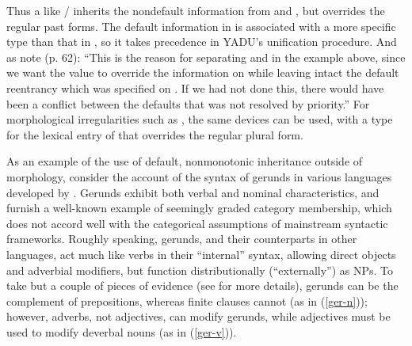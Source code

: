 \documentclass[output=paper
 	        ,biblatex
                ,babelshorthands
                ,newtxmath
                ,draftmode
                ,colorlinks, citecolor=brown
]{langscibook}
\begin{document}
Thus a  like / inherits the nondefault information from  and , but overrides the regular past forms.
The default information in  is associated with a more specific type than that in , so it takes precedence in YADU's unification procedure.
And as \citeauthor{LC99a} note (p. 62): ``This is the reason for separating  and  in the example above, since we want the  value to override the  information on  while leaving intact the default reentrancy which was specified on .  If we had not done this, there would have been a conflict between the defaults that was not resolved by priority.'' For morphological irregularities such as , the same devices can be used, with a type for the lexical entry of  that overrides the regular plural form.

As an example of the use of default, nonmonotonic inheritance outside of morphology, consider the account of the syntax of gerunds in various languages developed by \citet{Malouf2000a}.
Gerunds exhibit both verbal and nominal characteristics, and furnish a well-known example of seemingly graded category membership, which does not accord well with the categorical assumptions of mainstream syntactic frameworks.
Roughly speaking,  gerunds, and their counterparts in other languages, act much like verbs in their ``internal'' syntax, allowing direct objects and adverbial modifiers, but function distributionally (``externally'') as NPs.
To take but a couple of pieces of evidence (see \citealt[27--33]{Malouf2000a} for more details), 
gerunds can be the complement of prepositions, whereas finite clauses cannot (as in (\ref{ger-n})); however, adverbs, not adjectives, can modify gerunds, while adjectives must be used to modify deverbal nouns (as in (\ref{ger-v})).


\eal
\label{ger-n}
\zl
\eal
\label{ger-v}
\zl
\end{document}
